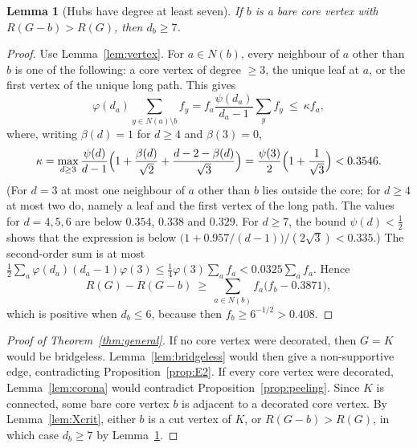 \documentclass[11pt,a4paper]{article}
\newtheorem{lemma}[theorem]{Lemma}
\theoremstyle{definition}
\begin{document}
\begin{lemma}[Hubs have degree at least seven]\label{lem:hub}
If $b$ is a bare core vertex with $R(G-b)>R(G)$, then $d_b\ge7$.
\end{lemma}
\begin{proof}
Use Lemma~\ref{lem:vertex}. For $a\in N(b)$, every neighbour of $a$ other than $b$ is one of the following: a core vertex of degree $\ge3$, the unique leaf at $a$, or the first vertex of the unique long path. This gives
\[
\varphi(d_a)\sum_{y\in N(a)\setminus b}f_y=f_a\frac{\psi(d_a)}{d_a-1}\sum_{y}f_y\ \le\ \kappa f_a ,
\]
where, writing $\beta(d)=1$ for $d\ge4$ and $\beta(3)=0$,
\[
\kappa=\max_{d\ge3}\frac{\psi(d)}{d-1}\Bigl(1+\frac{\beta(d)}{\sqrt2}+\frac{d-2-\beta(d)}{\sqrt3}\Bigr)=\frac{\psi(3)}2\Bigl(1+\frac1{\sqrt3}\Bigr)<0.3546 .
\]
(For $d=3$ at most one neighbour of $a$ other than $b$ lies outside the core; for $d\ge4$ at most two do, namely a leaf and the first vertex of the long path. The values for $d=4,5,6$ are below $0.354$, $0.338$ and $0.329$. For $d\ge7$, the bound $\psi(d)<\frac12$ shows that the expression is below $\bigl(1+0.957/(d-1)\bigr)/(2\sqrt3)<0.335$.)
The second-order sum is at most $\frac12\sum_a\varphi(d_a)(d_a-1)\varphi(3)\le\frac14\varphi(3)\sum_af_a<0.0325\sum_af_a$. Hence
\[
R(G)-R(G-b)\ \ge\ \sum_{a\in N(b)}f_a\bigl(f_b-0.3871\bigr),
\]
which is positive when $d_b\le6$, because then $f_b\ge6^{-1/2}>0.408$.
\end{proof}

\begin{proof}[Proof of Theorem~\ref{thm:general}]
If no core vertex were decorated, then $G=K$ would be bridgeless. Lemma~\ref{lem:bridgeless} would then give a non-supportive edge, contradicting Proposition~\ref{prop:E2}. If every core vertex were decorated, Lemma~\ref{lem:corona} would contradict Proposition~\ref{prop:peeling}. Since $K$ is connected, some bare core vertex $b$ is adjacent to a decorated core vertex. By Lemma~\ref{lem:Xcrit}, either $b$ is a cut vertex of $K$, or $R(G-b)>R(G)$, in which case $d_b\ge7$ by Lemma~\ref{lem:hub}.
\end{proof}
\end{document}
